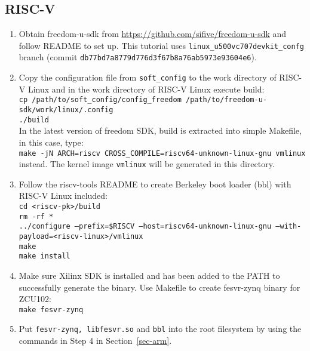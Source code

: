 \documentclass[a4paper,11pt]{article}
\begin{document}
\subsection{RISC-V}
\begin{enumerate}
\item Obtain freedom-u-sdk from \url{https://github.com/sifive/freedom-u-sdk} and follow README to set up. This tutorial uses {\tt linux\_u500vc707devkit\_confg} branch (commit {\tt db77bd7a8779d776d3f67b8a76ab5973e93604e6}).

\item Copy the configuration file from {\tt soft\_config} to the work directory of RISC-V Linux and in the work directory of RISC-V Linux execute build:\\
{\tt cp /path/to/soft\_config/config\_freedom /path/to/freedom-u-sdk/work/linux/.config}\\
{\tt ./build}\\

In the latest version of freedom SDK, build is extracted into simple Makefile, in this case,
type:\\ 
{\tt make -jN ARCH=riscv CROSS\_COMPILE=riscv64-unknown-linux-gnu vmlinux}\\ 
instead.
The kernel image {\tt vmlinux} will be generated in this directory.

\item Follow the riscv-tools README to create Berkeley boot loader (bbl) with RISC-V Linux included:\\
{\tt cd <riscv-pk>/build\\
rm -rf *\\
../configure --prefix=\$RISCV --host=riscv64-unknown-linux-gnu --with-payload=<riscv-linux>/vmlinux\\
make\\
make install}

\item Make sure Xilinx SDK is installed and has been added to the PATH to successfully generate the binary. 
Use Makefile to create fesvr-zynq binary for ZCU102:\\
{\tt make fesvr-zynq}


\item Put {\tt fesvr-zynq, libfesvr.so} and {\tt bbl} into the root filesystem by using the commands in Step 4 in Section~\ref{sec-arm}.
\end{enumerate}
\end{document}
